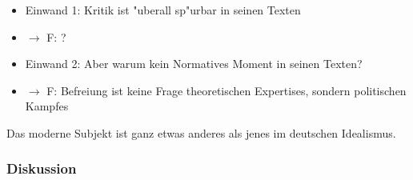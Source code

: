 \documentclass[emulatestandardclasses]{scrartcl}
\begin{document}
\begin{itemize}
  \item Einwand 1: Kritik ist "uberall sp"urbar in seinen Texten
  \item $\rightarrow$ F: ?
  \item Einwand 2: Aber warum kein Normatives Moment in seinen Texten?
  \item $\rightarrow$ F: Befreiung ist keine Frage theoretischen Expertises, sondern politischen Kampfes
\end{itemize}

Das moderne Subjekt ist ganz etwas anderes als jenes im deutschen Idealismus.

\subsubsection{Diskussion}



\newpage


\end{document}
